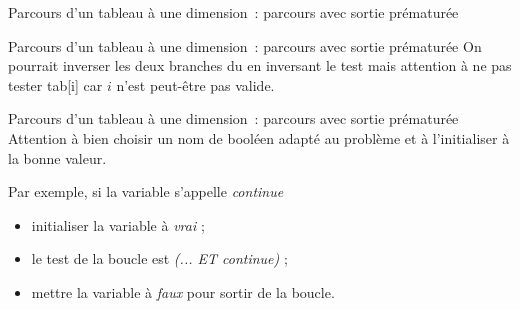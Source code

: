 \begin{frame}{Parcours d'un tableau à une dimension~: parcours avec sortie prématurée}
\end{frame}

\begin{frame}{Parcours d'un tableau à une dimension~: parcours avec sortie prématurée}
	On pourrait inverser les deux branches du  en inversant le test
	mais attention à ne pas tester tab[i] car $i$ n'est peut-être pas valide.
	
\end{frame}

\begin{frame}{Parcours d'un tableau à une dimension~: parcours avec sortie prématurée}
	Attention à bien choisir un nom de booléen adapté au problème
	et à l'initialiser à la bonne valeur. 
	
	\bigskip
	
	Par exemple, si la variable s'appelle \textit{continue}
	\begin{itemize}
		\item initialiser la variable à \textit{vrai} ;
		\item le test de la boucle est \textit{(... ET continue)} ;
		\item mettre la variable à \textit{faux} pour sortir de la boucle.
	\end{itemize}
\end{frame}
